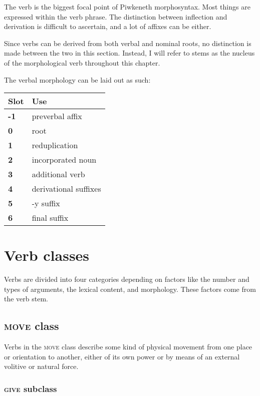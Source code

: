 \documentclass[smallroyalvopaper,9pt]{memoir}
\newcommand{\lang}{Piwkeneth}
\begin{document}
The verb is the biggest focal point of \lang{} morphosyntax. Most things are expressed within the verb phrase. The distinction between inflection and derivation is difficult to ascertain, and a lot of affixes can be either.

Since verbs can be derived from both verbal and nominal roots, no distinction is made between the two in this section. Instead, I will refer to stems as the nucleus of the morphological verb throughout this chapter.

The verbal morphology can be laid out as such:

\begin{table}[ht]
    \centering
    \begin{tabular}{>{\bfseries}ll}
        \toprule
        Slot & Use \\
        \midrule
        -1 & preverbal affix \\
        0 & root \\
        1 & reduplication \\
        2 & incorporated noun \\
        3 & additional verb \\
        4 & derivational suffixes \\
        5 & -y suffix \\
        6 & final suffix \\
        \bottomrule
    \end{tabular}
\end{table}

\section{Verb classes}

Verbs are divided into four categories depending on factors like the number and types of arguments, the lexical content, and morphology. These factors come from the verb stem.

\subsection{\textsc{move} class}

Verbs in the \textsc{move} class describe some kind of physical movement from one place or orientation to another, either of its own power or by means of an external volitive or natural force. 

\subsubsection{\textsc{give} subclass}
\end{document}

